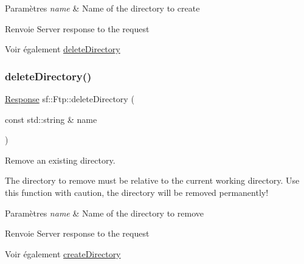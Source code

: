 \begin{DoxyParams}{Paramètres}
{\em name} & Name of the directory to create\\
\hline
\end{DoxyParams}
\begin{DoxyReturn}{Renvoie}
Server response to the request
\end{DoxyReturn}
\begin{DoxySeeAlso}{Voir également}
\hyperlink{classsf_1_1Ftp_a2a8a7ef9144204b5b319c9a4be8806c2}{delete\+Directory} 
\end{DoxySeeAlso}
\mbox{\label{classsf_1_1Ftp_a2a8a7ef9144204b5b319c9a4be8806c2}} 
\subsubsection{\texorpdfstring{delete\+Directory()}{deleteDirectory()}}
{\footnotesize\ttfamily \hyperlink{classsf_1_1Ftp_1_1Response}{Response} sf\+::\+Ftp\+::delete\+Directory (\begin{DoxyParamCaption}\item[{const std\+::string \&}]{name }\end{DoxyParamCaption})}



Remove an existing directory. 

The directory to remove must be relative to the current working directory. Use this function with caution, the directory will be removed permanently!


\begin{DoxyParams}{Paramètres}
{\em name} & Name of the directory to remove\\
\hline
\end{DoxyParams}
\begin{DoxyReturn}{Renvoie}
Server response to the request
\end{DoxyReturn}
\begin{DoxySeeAlso}{Voir également}
\hyperlink{classsf_1_1Ftp_a247b84c4b25da37804218c2b748c4787}{create\+Directory} 
\end{DoxySeeAlso}
\mbox{\label{classsf_1_1Ftp_a8aa272b0eb7769a850006e70fcad370f}} 
